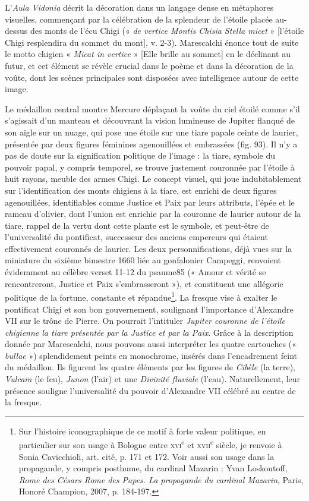 \documentclass[12pt,twoside,openany]{book}
\begin{document}
L’\textit{Aula Vidonia} décrit la décoration dans un langage dense en métaphores visuelles, commençant par la célébration de la splendeur de l’étoile placée au-dessus des monts de l’écu Chigi (« \textit{de vertice Montis Chisia Stella micet} » [l’étoile Chigi resplendira du sommet du mont], v. 2-3). Marescalchi énonce tout de suite le motto chigien « \textit{Micat in vertice} » [Elle brille au sommet] en le déclinant au futur, et cet élément se révèle crucial dans le poème et dans la décoration de la voûte, dont les scènes principales sont disposées avec intelligence autour de cette image.

Le médaillon central montre Mercure déplaçant la voûte du ciel étoilé comme s’il s’agissait d’un manteau et découvrant la vision lumineuse de Jupiter flanqué de son aigle sur un nuage, qui pose une étoile sur une tiare papale ceinte de laurier, présentée par deux figures féminines agenouillées et embrassées (fig. 93). Il n’y a pas de doute sur la signification politique de l’image : la tiare, symbole du pouvoir papal, y compris temporel, se trouve justement couronnée par l’étoile à huit rayons, meuble des armes Chigi. Le concept visuel, qui joue indubitablement sur l’identification des monts chigiens à la tiare, est enrichi de deux figures agenouillées, identifiables comme Justice et Paix par leurs attributs, l’épée et le rameau d’olivier, dont l’union est enrichie par la couronne de laurier autour de la tiare, rappel de la vertu dont cette plante est le symbole, et peut-être de l’universalité du pontificat, successeur des anciens empereurs qui étaient effectivement couronnés de laurier. Les deux personnifications, déjà vues sur la miniature du sixième bimestre 1660 liée au gonfalonier Campeggi, renvoient évidemment au célèbre verset 11-12 du psaume85 (« Amour et vérité se rencontreront, Justice et Paix s’embrasseront »), et constituent une allégorie politique de la fortune, constante et répandue\footnote{Sur l’histoire iconographique de ce motif à forte valeur politique, en particulier sur son usage à Bologne entre \textsc{xvi}\textsuperscript{e} et \textsc{xvii}\textsuperscript{e} siècle, je renvoie à Sonia Cavicchioli, art. cité, p. 171 et 172. Voir aussi son usage dans la propagande, y compris posthume, du cardinal Mazarin : Yvan Loskoutoff, \textit{Rome des Césars Rome des Papes. La propagande du cardinal Mazarin}, Paris, Honoré Champion, 2007, p. 184-197.}. La fresque vise à exalter le pontificat Chigi et son bon gouvernement, soulignant l’importance d’Alexandre VII sur le trône de Pierre. On pourrait l’intituler \textit{Jupiter couronne de l’étoile chigienne la tiare présentée par la Justice et par la Paix}. Grâce à la description donnée par Marescalchi, nous pouvons aussi interpréter les quatre cartouches (« \textit{bullae} ») splendidement peints en monochrome, insérés dans l’encadrement feint du médaillon. Ils figurent les quatre éléments par les figures de \textit{Cibèle }(la terre), \textit{Vulcain }(le feu), \textit{Junon }(l’air) et une \textit{Divinité fluviale }(l’eau). Naturellement, leur présence souligne l’universalité du pouvoir d’Alexandre VII célébré au centre de la fresque.
\end{document}
